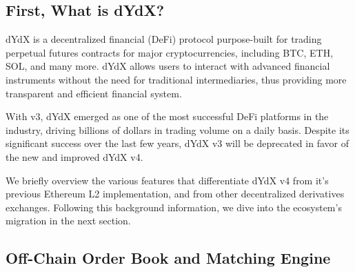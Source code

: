     \subsection{First, What is dYdX?}

        dYdX is a decentralized financial (DeFi) protocol purpose-built for trading perpetual futures contracts for major cryptocurrencies, including BTC, ETH, SOL, and many more. dYdX allows users to interact with advanced financial instruments without the need for traditional intermediaries, thus providing more transparent and efficient financial system.

        With v3, dYdX emerged as one of the most successful DeFi platforms in the industry, driving billions of dollars in trading volume on a daily basis. Despite its significant success over the last few years, dYdX v3 will be deprecated in favor of the new and improved dYdX v4.

        We briefly overview the various features that differentiate dYdX v4 from it's previous Ethereum L2 implementation, and from other decentralized derivatives exchanges. Following this background information, we dive into the ecosystem's migration in the next section.
        
    \subsection{Off-Chain Order Book and Matching Engine}

